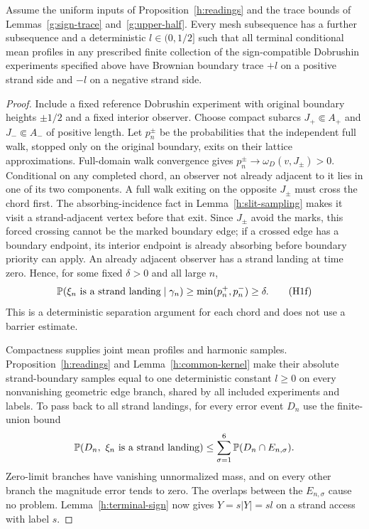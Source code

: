 \begin{proposition}\label{h:height-gap}
Assume the uniform inputs of Proposition~\ref{h:readings} and the
trace bounds of Lemmas~\ref{g:sign-trace} and~\ref{g:upper-half}.
Every mesh subsequence has a
further subsequence and a deterministic $l\in(0,1/2]$ such that all
terminal conditional mean profiles in any prescribed finite collection
of the sign-compatible Dobrushin experiments specified above have
Brownian boundary trace $+l$ on a
positive strand side and $-l$ on a negative strand side.
\end{proposition}
\begin{proof}
Include a fixed reference Dobrushin experiment with original boundary
heights $\pm1/2$ and a fixed interior observer. Choose compact subarcs
$J_+\Subset A_+$ and $J_-\Subset A_-$ of positive length. Let
$p_n^\pm$ be the probabilities that the independent full walk, stopped
only on the original boundary, exits on their lattice approximations.
Full-domain walk convergence gives
$p_n^\pm\to\omega_D(v,J_\pm)>0$. Conditional on any completed chord,
an observer not already adjacent to it lies in one of its two
components. A full walk exiting on the opposite $J_\pm$ must cross the
chord first. The absorbing-incidence fact in
Lemma~\ref{h:slit-sampling} makes it visit a strand-adjacent vertex
before that exit. Since $J_\pm$ avoid the marks, this forced crossing
cannot be the marked boundary edge; if a crossed edge has a boundary
endpoint, its interior endpoint is already absorbing before boundary
priority can apply. An already adjacent observer has a strand landing
at time zero. Hence, for some fixed $\delta>0$ and all large $n$,
\[
 \mathbb P(\xi_n\hbox{ is a strand landing}\mid\gamma_n)
       \ge \min(p_n^+,p_n^-)\ge\delta.                  \tag{H1f}
\]
This is a deterministic separation argument for each chord and does
not use a barrier estimate.

Compactness supplies joint mean profiles and harmonic samples.
Proposition~\ref{h:readings} and Lemma~\ref{h:common-kernel} make
their absolute strand-boundary samples equal to one deterministic
constant $l\ge0$ on every nonvanishing geometric edge branch, shared
by all included experiments and labels. To pass back to all strand
landings, for every error event $D_n$ use the finite-union bound
\[
 \Prob(D_n,\ \xi_n\hbox{ is a strand landing})
       \le\sum_{\sigma=1}^6\Prob(D_n\cap E_{n,\sigma}).
\]
Zero-limit branches have vanishing unnormalized mass, and on every
other branch the magnitude error tends to zero. The overlaps between
the $E_{n,\sigma}$ cause no problem. Lemma~\ref{h:terminal-sign} now
gives $Y=s|Y|=sl$ on a strand access with label $s$.


\end{proof}
